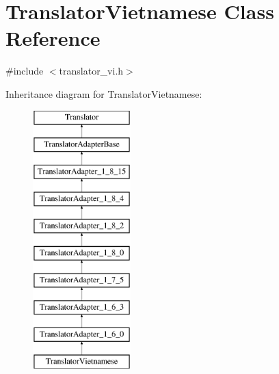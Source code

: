 \hypertarget{class_translator_vietnamese}{}\section{Translator\+Vietnamese Class Reference}
\label{class_translator_vietnamese}


{\ttfamily \#include $<$translator\+\_\+vi.\+h$>$}

Inheritance diagram for Translator\+Vietnamese\+:\begin{figure}[H]
\begin{center}
\leavevmode
\includegraphics[height=10.000000cm]{class_translator_vietnamese}
\end{center}
\end{figure}
